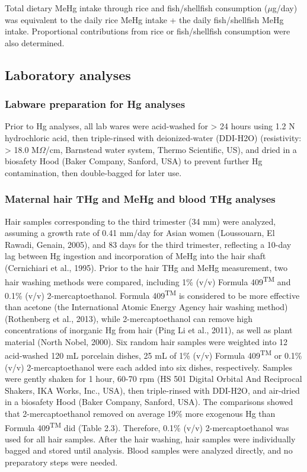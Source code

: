 Total dietary MeHg intake through rice and fish/shellfish consumption (\({\mu}\)g/day) was equivalent to the daily rice MeHg intake + the daily fish/shellfish MeHg intake. Proportional contributions from rice or fish/shellfish consumption were also determined. 

\subsection{Laboratory analyses}

\subsubsection{Labware preparation for Hg analyses}

Prior to Hg analyses, all lab wares were acid-washed for > 24 hours using 1.2 N hydrochloric acid, then triple-rinsed with deionized-water (DDI-H2O) (resistivity: > 18.0 M\({\Omega}\)/cm, Barnstead water system, Thermo Scientific, US), and dried in a biosafety Hood (Baker Company, Sanford, USA) to prevent further Hg contamination, then double-bagged for later use. 

\subsubsection{Maternal hair THg and MeHg and blood THg analyses}

Hair samples corresponding to the third trimester (34 mm) were analyzed, assuming a growth rate of 0.41 mm/day for Asian women (Loussouarn, El Rawadi,  Genain, 2005), and 83 days for the third trimester, reflecting a 10-day lag between Hg ingestion and incorporation of MeHg into the hair shaft (Cernichiari et al., 1995). Prior to the hair THg and MeHg measurement, two hair washing methods were compared, including 1\% (v/v) Formula 409\textsuperscript{TM} and 0.1\% (v/v) 2-mercaptoethanol. Formula 409\textsuperscript{TM} is considered to be more effective than acetone (the International Atomic Energy Agency hair washing method) (Rothenberg et al., 2013), while 2-mercaptoethanol can remove high concentrations of inorganic Hg from hair (Ping Li et al., 2011), as well as plant material (North  Nobel, 2000). Six random hair samples were weighted into 12 acid-washed 120 mL porcelain dishes, 25 mL of 1\% (v/v) Formula 409\textsuperscript{TM} or 0.1\% (v/v) 2-mercaptoethanol were each added into six dishes, respectively. Samples were gently shaken for 1 hour, 60-70 rpm (HS 501 Digital Orbital And Reciprocal Shakers, IKA Works, Inc., USA), then triple-rinsed with DDI-H2O, and air-dried in a biosafety Hood (Baker Company, Sanford, USA). The comparisons showed that 2-mercaptoethanol removed on average 19\% more exogenous Hg than Formula 409\textsuperscript{TM} did (Table 2.3). Therefore, 0.1\% (v/v) 2-mercaptoethanol was used for all hair samples. After the hair washing, hair samples were individually bagged and stored until analysis. Blood samples were analyzed directly, and no preparatory steps were needed.

